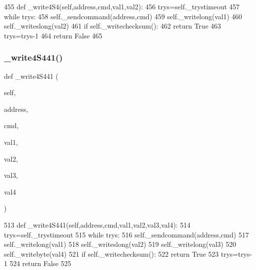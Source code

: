 \begin{DoxyCode}
455     \textcolor{keyword}{def }\_write4S4(self,address,cmd,val1,val2):
456         trys=self.\_trystimeout
457         \textcolor{keywordflow}{while} trys:
458             self.\_sendcommand(address,cmd)
459             self.\_writelong(val1)
460             self.\_writeslong(val2)
461             \textcolor{keywordflow}{if} self.\_writechecksum():
462                 \textcolor{keywordflow}{return} \textcolor{keyword}{True}
463             trys=trys-1
464         \textcolor{keywordflow}{return} \textcolor{keyword}{False}
465 
\end{DoxyCode}
\mbox{\label{classtoxic__hardware_1_1roboclaw__3_1_1Roboclaw_ac5229f360d098694a67971eab10d5e66}} 
\subsubsection{\texorpdfstring{\+\_\+write4\+S441()}{\_write4S441()}}
{\footnotesize\ttfamily def \+\_\+write4\+S441 (\begin{DoxyParamCaption}\item[{}]{self,  }\item[{}]{address,  }\item[{}]{cmd,  }\item[{}]{val1,  }\item[{}]{val2,  }\item[{}]{val3,  }\item[{}]{val4 }\end{DoxyParamCaption})\hspace{0.3cm}{\ttfamily [private]}}


\begin{DoxyCode}
513     \textcolor{keyword}{def }\_write4S441(self,address,cmd,val1,val2,val3,val4):
514         trys=self.\_trystimeout
515         \textcolor{keywordflow}{while} trys:
516             self.\_sendcommand(address,cmd)
517             self.\_writelong(val1)
518             self.\_writeslong(val2)
519             self.\_writelong(val3)
520             self.\_writebyte(val4)
521             \textcolor{keywordflow}{if} self.\_writechecksum():
522                 \textcolor{keywordflow}{return} \textcolor{keyword}{True}
523             trys=trys-1
524         \textcolor{keywordflow}{return} \textcolor{keyword}{False}
525 
\end{DoxyCode}
\mbox{\label{classtoxic__hardware_1_1roboclaw__3_1_1Roboclaw_ab245d118d96ac56d918b3e9a76315aac}} 
